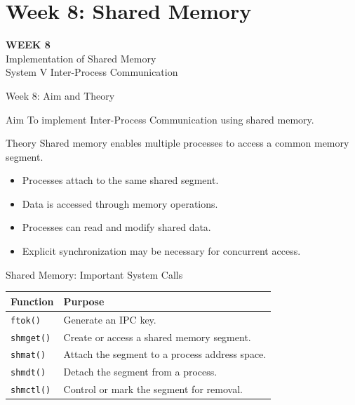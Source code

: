 \documentclass[aspectratio=169,10pt]{beamer}
\begin{document}
\section{Week 8: Shared Memory}

\begin{frame}
\centering
\vfill
{\Huge\bfseries WEEK 8}\\[0.5cm]
{\LARGE Implementation of Shared Memory}\\[0.4cm]
{\large System V Inter-Process Communication}
\vfill
\end{frame}

\begin{frame}{Week 8: Aim and Theory}

\begin{block}{Aim}
To implement Inter-Process Communication
using shared memory.
\end{block}

\begin{block}{Theory}
Shared memory enables multiple processes
to access a common memory segment.
\end{block}

\begin{itemize}
    \item Processes attach to the same shared segment.
    \item Data is accessed through memory operations.
    \item Processes can read and modify shared data.
    \item Explicit synchronization may be necessary
    for concurrent access.
\end{itemize}

\end{frame}

\begin{frame}{Shared Memory: Important System Calls}

\begin{center}
\begin{tabular}{p{3cm}p{8cm}}
\toprule
\textbf{Function} & \textbf{Purpose}\\
\midrule
\texttt{ftok()} &
Generate an IPC key.\\
\addlinespace
\texttt{shmget()} &
Create or access a shared memory segment.\\
\addlinespace
\texttt{shmat()} &
Attach the segment to a process address space.\\
\addlinespace
\texttt{shmdt()} &
Detach the segment from a process.\\
\addlinespace
\texttt{shmctl()} &
Control or mark the segment for removal.\\
\bottomrule
\end{tabular}
\end{center}

\end{frame}
\end{document}
